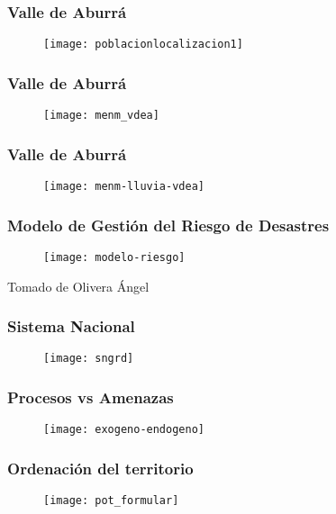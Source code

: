\documentclass[12pt]{beamer}
\begin{document}
\begin{frame}
\frametitle{Valle de Aburrá}
\begin{figure}
\centering
\texttt{[image: poblacionlocalizacion1]}
\end{figure}
\end{frame}
\begin{frame}
\frametitle{Valle de Aburrá}
\begin{figure}
\centering
\texttt{[image: menm\_vdea]}
\end{figure}
\end{frame}
\begin{frame}
\frametitle{Valle de Aburrá}
\begin{figure}
\centering
\texttt{[image: menm-lluvia-vdea]}
\end{figure}
\end{frame}
\begin{frame}
\frametitle{Modelo de Gestión del Riesgo de Desastres}
\begin{figure}
\centering
\texttt{[image: modelo-riesgo]}
\end{figure}
\tiny{Tomado de Olivera Ángel}
\end{frame}
\begin{frame}
\frametitle{Sistema Nacional}
\begin{figure}
\centering
\texttt{[image: sngrd]}
\end{figure}
\end{frame}
\begin{frame}
\frametitle{Procesos vs Amenazas}
\begin{figure}
\centering
\texttt{[image: exogeno-endogeno]}
\end{figure}
\end{frame}
\begin{frame}
\frametitle{Ordenación del territorio}
\begin{figure}
\centering
\texttt{[image: pot\_formular]}
\end{figure}
\end{frame}
\end{document}
